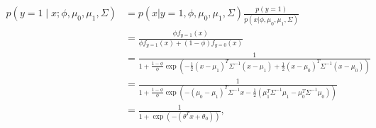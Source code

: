 %
%

\begin{answer}
	\begin{align*}
	p(y = 1\mid x; \phi, \mu_0, \mu_1, \Sigma)
	&= p(x | y=1, \phi, \mu_0, \mu_1, \Sigma) \frac{p(y=1)}{p(x | \phi, \mu_0, \mu_1, \Sigma)} \\
	&= \frac{\phi f_{y=1}(x)}{\phi f_{y=1}(x) + (1-\phi) f_{y=0}(x)}\\
	&= \frac{1}
		{1 + \frac{1-\phi}{\phi} \exp \left(
			 -\frac{1}{2} (x-\mu_1)^T \Sigma^{-1} (x-\mu_1)
			 + \frac{1}{2} (x-\mu_0)^T \Sigma^{-1} (x-\mu_0)
		\right)}\\
	&= \frac{1}{1 + \frac{1-\phi}{\phi} \exp \left(
		- (\mu_0-\mu_1)^T \Sigma^{-1} x 
		- \frac{1}{2}( \mu_1^T \Sigma^{-1} \mu_1 - \mu_0^T \Sigma^{-1} \mu_0)
	\right)}\\ 
	&=\frac{1}{1 + \exp(-(\theta^T x + \theta_0))},
	\end{align*}
\end{answer}

%